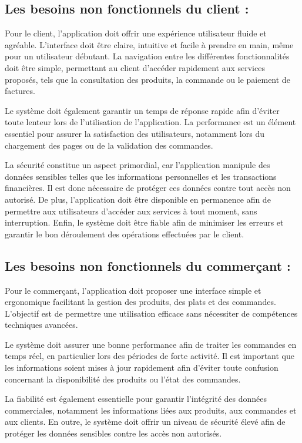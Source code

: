 \documentclass[12pt,fleqn,a4paper]{report}
\begin{document}
\begin{justify}
\newpage
\subsection{Les besoins non fonctionnels du client :}
Pour le client, l'application doit offrir une expérience utilisateur fluide et agréable. L'interface doit être claire, intuitive et facile à prendre en main, même pour un utilisateur débutant. La navigation entre les différentes fonctionnalités doit être simple, permettant au client d'accéder rapidement aux services proposés, tels que la consultation des produits, la commande ou le paiement de factures.

Le système doit également garantir un temps de réponse rapide afin d'éviter toute lenteur lors de l'utilisation de l'application. La performance est un élément essentiel pour assurer la satisfaction des utilisateurs, notamment lors du chargement des pages ou de la validation des commandes.

La sécurité constitue un aspect primordial, car l'application manipule des données sensibles telles que les informations personnelles et les transactions financières. Il est donc nécessaire de protéger ces données contre tout accès non autorisé. De plus, l'application doit être disponible en permanence afin de permettre aux utilisateurs d'accéder aux services à tout moment, sans interruption. Enfin, le système doit être fiable afin de minimiser les erreurs et garantir le bon déroulement des opérations effectuées par le client.

\subsection{Les besoins non fonctionnels du commerçant :}
Pour le commerçant, l'application doit proposer une interface simple et ergonomique facilitant la gestion des produits, des plats et des commandes. L'objectif est de permettre une utilisation efficace sans nécessiter de compétences techniques avancées.

Le système doit assurer une bonne performance afin de traiter les commandes en temps réel, en particulier lors des périodes de forte activité. Il est important que les informations soient mises à jour rapidement afin d'éviter toute confusion concernant la disponibilité des produits ou l'état des commandes.

La fiabilité est également essentielle pour garantir l'intégrité des données commerciales, notamment les informations liées aux produits, aux commandes et aux clients. En outre, le système doit offrir un niveau de sécurité élevé afin de protéger les données sensibles contre les accès non autorisés.


\end{justify}
\end{document}
